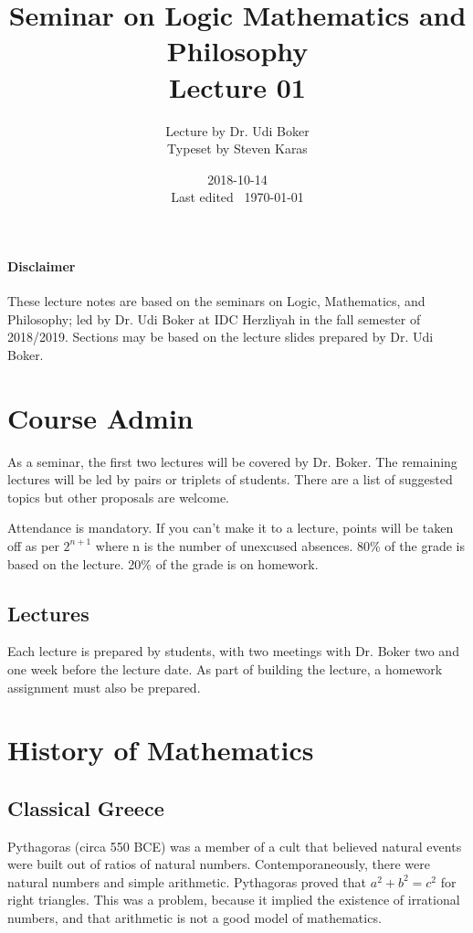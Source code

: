 \documentclass{idc_msc}
\title{Seminar on Logic Mathematics and Philosophy \\\large Lecture 01}
\date{2018-10-14 \\ Last edited \currenttime\ \today}
\author{Lecture by Dr. Udi Boker\\Typeset by Steven Karas}
\begin{document}
\maketitle

\nocite{benacerraf1983philosophy}

\paragraph{Disclaimer}

These lecture notes are based on the seminars on Logic, Mathematics, and Philosophy; led by Dr. Udi Boker at IDC Herzliyah in the fall semester of 2018/2019.
Sections may be based on the lecture slides prepared by Dr. Udi Boker.

\section{Course Admin}

As a seminar, the first two lectures will be covered by Dr. Boker.
The remaining lectures will be led by pairs or triplets of students.
There are a list of suggested topics but other proposals are welcome.

Attendance is mandatory.
If you can't make it to a lecture, points will be taken off as per \(2^{n+1}\) where n is the number of unexcused absences.
80\% of the grade is based on the lecture.
20\% of the grade is on homework.

\subsection{Lectures}

Each lecture is prepared by students, with two meetings with Dr. Boker two and one week before the lecture date.
As part of building the lecture, a homework assignment must also be prepared.

\section{History of Mathematics}

\subsection{Classical Greece}

Pythagoras (circa 550 BCE) was a member of a cult that believed natural events were built out of ratios of natural numbers.
Contemporaneously, there were natural numbers and simple arithmetic.
Pythagoras proved that \(a^2 + b^2 = c^2\) for right triangles.
This was a problem, because it implied the existence of irrational numbers, and that arithmetic is not a good model of mathematics.
\end{document}
